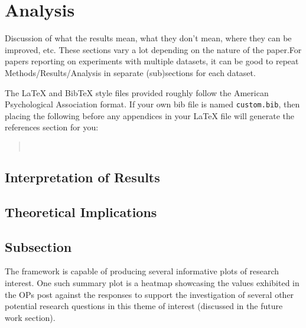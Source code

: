 
\section{Analysis}\label{sec:Analysis}

\textcolor{black!40}{Discussion of what the results mean, what they don't mean, where they can be improved, etc. These sections vary a lot depending on the nature of the paper.For papers reporting on experiments with multiple datasets, it can be good to repeat Methods/Results/Analysis in separate (sub)sections for each dataset.}

The \LaTeX{} and Bib\TeX{} style files provided roughly follow the American Psychological Association format.
If your own bib file is named \texttt{custom.bib}, then placing the following before any appendices in your \LaTeX{} file will generate the references section for you:
\begin{quote}
\begin{verbatim}


\end{verbatim}
\end{quote}
% 
% 

\subsection{Interpretation of Results}
\textcolor{black!30}{\lipsum[53-56]}

\subsection{Theoretical Implications}
\textcolor{black!30}{\lipsum[57-59]}
\nocite{Ando2005,augenstein-etal-2016-stance,andrew2007scalable,rasooli-tetrault-2015,goodman-etal-2016-noise,harper-2014-learning}
\subsection{Subsection}
The framework is capable of producing several informative plots of research interest. One such summary plot is a heatmap showcasing the values exhibited in the OPs post against the responses to support the investigation of several other potential research questions in this theme of interest (discussed in the future work section).
\textcolor{black!30}{\lipsum[60-62]}